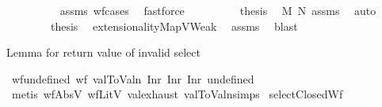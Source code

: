 \begin{isabellebody}
\ \ \ \ \ \ \ \ \isamarkupfalse%
\ assms{\isacharparenleft}{\kern0pt}{}{\isacharparenright}{\kern0pt}\ wf{\isachardot}{\kern0pt}cases\ \isamarkupfalse%
\ fastforce\isanewline
\ \ \ \ \ \ \isamarkupfalse%
\ \isamarkupfalse%
\ {\isacharquery}{\kern0pt}thesis\ \isamarkupfalse%
\ M\ N\ assms\ \isamarkupfalse%
\ auto\isanewline
\ \ \ \ \isamarkupfalse%
\isanewline
\ \ \isamarkupfalse%
\isanewline
\ \ \isamarkupfalse%
\ \isamarkupfalse%
\ {\isacharquery}{\kern0pt}thesis\ \isamarkupfalse%
\ extensionalityMapVWeak\ \isamarkupfalse%
\ assms{\isacharparenleft}{\kern0pt}{}{\isacharcomma}{\kern0pt}{}{\isacharcomma}{\kern0pt}{}{\isacharparenright}{\kern0pt}\ \isamarkupfalse%
\ blast\isanewline
{}\isamarkupfalse%
%
\endisatagproof
{\isafoldproof}%
%
\isadelimproof
%
\endisadelimproof
%
\isadelimdocument
%
\endisadelimdocument
%
\isatagdocument
%
\isamarkuptrue%
%
\endisatagdocument
{\isafolddocument}%
%
\isadelimdocument
%
\endisadelimdocument
%
\begin{isamarkuptext}%
Lemma for return value of invalid select%
\end{isamarkuptext}\isamarkuptrue%
\isamarkupfalse%
\ wf{\isacharunderscore}{\kern0pt}undefined{\isacharcolon}{\kern0pt}\ {\isachardoublequoteopen}{\isacharparenleft}{\kern0pt}wf\ {\isacharparenleft}{\kern0pt}val{}ToValn\ {\isacharparenleft}{\kern0pt}Inr\ {\isacharparenleft}{\kern0pt}Inr\ {\isacharparenleft}{\kern0pt}Inr\ undefined{\isacharparenright}{\kern0pt}{\isacharparenright}{\kern0pt}{\isacharparenright}{\kern0pt}{\isacharparenright}{\kern0pt}{\isacharparenright}{\kern0pt}{\isachardoublequoteclose}\isanewline
%
\isadelimproof
\ \ %
\endisadelimproof
%
\isatagproof
{}\isamarkupfalse%
\ {\isacharparenleft}{\kern0pt}metis\ wfAbsV\ wfLitV\ val{}{\isachardot}{\kern0pt}exhaust\ val{}ToValn{\isachardot}{\kern0pt}simps{\isacharparenleft}{\kern0pt}{}{\isacharcomma}{\kern0pt}{}{\isacharparenright}{\kern0pt}{\isacharparenright}{\kern0pt}%
\endisatagproof
{\isafoldproof}%
%
\isadelimproof
\isanewline
%
\endisadelimproof
\isanewline
{}\isamarkupfalse%
\ selectClosedWf{\isacharcolon}{\kern0pt}\isanewline

\end{isabellebody}
